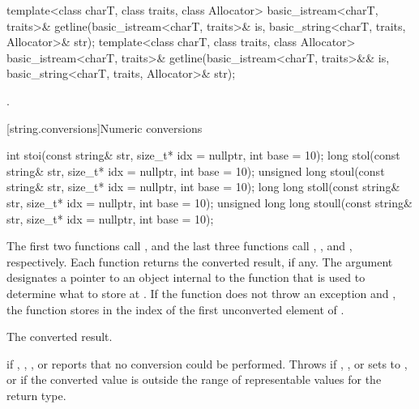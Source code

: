 %
\begin{itemdecl}
template<class charT, class traits, class Allocator>
  basic_istream<charT, traits>&
    getline(basic_istream<charT, traits>& is,
            basic_string<charT, traits, Allocator>& str);
template<class charT, class traits, class Allocator>
  basic_istream<charT, traits>&
    getline(basic_istream<charT, traits>&& is,
            basic_string<charT, traits, Allocator>& str);
\end{itemdecl}

\begin{itemdescr}
\pnum
\returns
{}.
\end{itemdescr}

[string.conversions]{Numeric conversions}

%
%
%
%
%
\begin{itemdecl}
int stoi(const string& str, size_t* idx = nullptr, int base = 10);
long stol(const string& str, size_t* idx = nullptr, int base = 10);
unsigned long stoul(const string& str, size_t* idx = nullptr, int base = 10);
long long stoll(const string& str, size_t* idx = nullptr, int base = 10);
unsigned long long stoull(const string& str, size_t* idx = nullptr, int base = 10);
\end{itemdecl}

\begin{itemdescr}
\pnum
\effects The first two functions call ,
and the last three functions call ,
, and , respectively. Each function returns the converted result, if any. The
argument  designates a pointer to an object internal to the function
that is used to determine what to store at . If the function does
not throw an exception and , the function stores in 
the index of the first unconverted element of .

\pnum
\returns The converted result.

\pnum
\throws {} if , ,
, or  reports that no conversion could be
performed. Throws  if , ,
 or  sets  to ,
or if the converted value is outside the range of representable values
for the return type.
\end{itemdescr}

